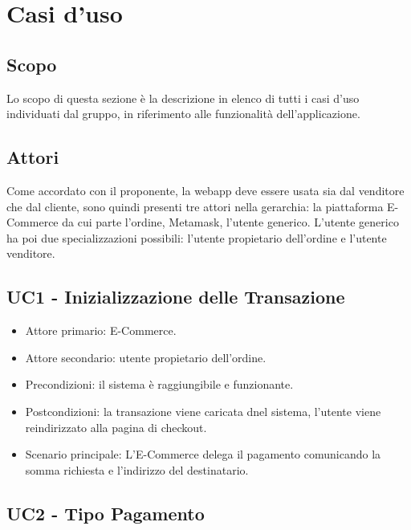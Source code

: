 \section{Casi d'uso}

\subsection{Scopo}
Lo scopo di questa sezione è la descrizione in elenco di tutti i casi d’uso individuati dal gruppo, in
riferimento alle funzionalità dell’applicazione.

\subsection{Attori}
Come accordato con il proponente, la webapp deve essere usata sia dal venditore che dal cliente,
sono quindi presenti tre attori nella gerarchia: la piattaforma E-Commerce da cui parte l'ordine, Metamask\glo, l'utente generico.
L'utente generico ha poi due specializzazioni possibili: l'utente propietario dell'ordine e l'utente venditore.

\subsection{UC1 - Inizializzazione delle Transazione}

\begin{itemize}
    \item Attore primario: E-Commerce.
    \item Attore secondario: utente propietario dell'ordine.
    \item Precondizioni: il sistema è raggiungibile e funzionante.
    \item Postcondizioni: la transazione viene caricata dnel sistema, l'utente viene reindirizzato alla pagina di checkout.
    \item Scenario principale: L'E-Commerce delega il pagamento comunicando la somma richiesta e l'indirizzo del destinatario.
\end{itemize}

\subsection{UC2 - Tipo Pagamento}

